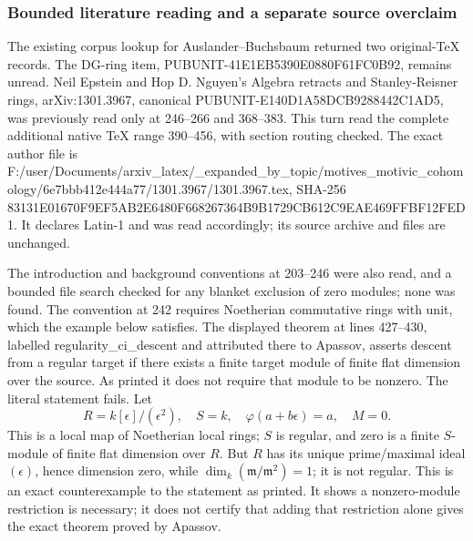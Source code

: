 \subsubsection{Bounded literature reading and a separate source overclaim}\label{algebra-proof-023-bounded-literature-reading-and-a-separate-source-overclaim}

The existing corpus lookup for Auslander--Buchsbaum returned two original-TeX records. The DG-ring item, PUBUNIT-\AlgebraIdentifierBreak{}41E1EB5390E0\AlgebraIdentifierBreak{}880F61FC0B92, remains unread. Neil Epstein and Hop D. Nguyen's Algebra retracts and Stanley-Reisner rings, arXiv:1301.3967, canonical PUBUNIT-\AlgebraIdentifierBreak{}E140D1A58DCB\AlgebraIdentifierBreak{}9288442C1AD5, was previously read only at 246--266 and 368--383. This turn read the complete additional native TeX range 390--456, with section routing checked. The exact author file is F:\allowbreak{}/\allowbreak{}user/\allowbreak{}Documents/\allowbreak{}arxiv\_\allowbreak{}latex/\allowbreak{}\_\allowbreak{}expanded\_\allowbreak{}by\_\allowbreak{}topic/\allowbreak{}motives\_\allowbreak{}motivic\_\allowbreak{}cohomology/\allowbreak{}6e7bbb412e44\allowbreak{}4a77/\allowbreak{}1301.\allowbreak{}3967/\allowbreak{}1301.\allowbreak{}3967.\allowbreak{}tex, SHA-256 8313\allowbreak{}1E01\allowbreak{}670F\allowbreak{}9EF5\allowbreak{}AB2E\allowbreak{}6480\allowbreak{}F668\allowbreak{}2673\allowbreak{}64B9\allowbreak{}B172\allowbreak{}9CB6\allowbreak{}12C9\allowbreak{}EAE4\allowbreak{}69FF\allowbreak{}BF12\allowbreak{}FED1. It declares Latin-1 and was read accordingly; its source archive and files are unchanged.

The introduction and background conventions at 203--246 were also read, and a bounded file search checked for any blanket exclusion of zero modules; none was found. The convention at 242 requires Noetherian commutative rings with unit, which the example below satisfies. The displayed theorem at lines 427--430, labelled regularity\_ci\_descent and attributed there to Apassov, asserts descent from a regular target if there exists a finite target module of finite flat dimension over the source. As printed it does not require that module to be nonzero. The literal statement fails. Let \[
R=k[\epsilon]/(\epsilon^2),\quad S=k,\quad
\varphi(a+b\epsilon)=a,\quad M=0 .
\] This is a local map of Noetherian local rings; \(S\) is regular, and zero is a finite \(S\)-module of finite flat dimension over \(R\). But \(R\) has its unique prime/maximal ideal \((\epsilon)\), hence dimension zero, while \(\dim_k(\mathfrak m/\mathfrak m^2)=1\); it is not regular. This is an exact counterexample to the statement as printed. It shows a nonzero-module restriction is necessary; it does not certify that adding that restriction alone gives the exact theorem proved by Apassov.

